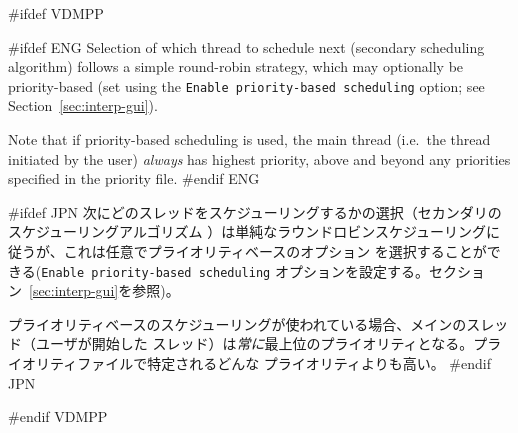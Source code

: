 \documentclass[\pformat,12pt]{article}
\newcommand{\vdmslpp}{VDM-SL}
\newcommand{\Toolbox}{Toolbox}
\newcommand{\vdmslpp}{VDM++}
\newcommand{\Toolbox}{Toolbox}
\renewcommand{\vdmslpp}{VDM++ VICE}
\newcommand{\guicmd}[1]{{\sf #1}}
\newcommand{\guicmd}[1]{{\gt #1}}
\begin{document}
#ifdef VDMPP

#ifdef ENG
Selection of which thread to schedule next (secondary scheduling
algorithm) follows a simple round-robin strategy, which may optionally
be priority-based (set using the \texttt{Enable priority-based
  scheduling} option; see Section~\ref{sec:interp-gui}).

Note that if priority-based scheduling is used, the main thread
(i.e.\ the thread initiated by the user) \textit{always} has highest
priority, above and beyond any priorities specified in the priority
file.
#endif ENG

#ifdef JPN
次にどのスレッドをスケジューリングするかの選択（セカンダリのスケジューリングアルゴリズム
）は単純なラウンドロビンスケジューリングに従うが、これは任意でプライオリティベースのオプション
を選択することができる(\texttt{Enable priority-based
  scheduling} オプションを設定する。セクション~\ref{sec:interp-gui}を参照)。

プライオリティベースのスケジューリングが使われている場合、メインのスレッド（ユーザが開始した
スレッド）は\textit{常に}最上位のプライオリティとなる。プライオリティファイルで特定されるどんな
プライオリティよりも高い。 
#endif JPN

#endif VDMPP


% 
%


\end{document}
